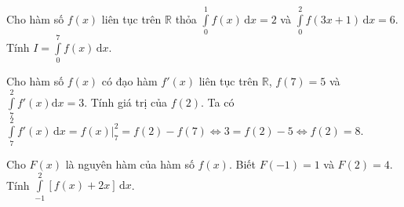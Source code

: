 \begin{bt}%
	Cho hàm số $f(x)$ liên tục trên $\mathbb{R}$ thỏa $\displaystyle\int\limits_{0}^{1} f(x) \mathrm{\,d}x=2$ và $\displaystyle\int\limits_{0}^{2} f(3x+1) \mathrm{\,d}x=6$. Tính $I=\displaystyle\int\limits_{0}^{7} f(x) \mathrm{\,d} x$.
	\end{bt}

\begin{bt}%

Cho hàm số $f(x)$ có đạo hàm $f'(x)$ liên tục trên $\mathbb{R}$, $f(7) = 5$ và $\displaystyle\int\limits_{7}^{2} f'(x)\mathrm{d}x = 3$. Tính giá trị của $f(2)$.
\loigiai
{
Ta có $\displaystyle\int\limits_{7}^{2} f'(x)\mathrm{\,d}x=f(x)\Big|_{7}^{2}=f(2)-f(7) \Leftrightarrow 3=f(2)-5 \Leftrightarrow f(2)=8$.
}
\end{bt}

\begin{bt}%
	Cho $F(x)$ là nguyên hàm của hàm số $f(x)$. Biết $F(-1)=1$ và $F(2)=4$. Tính $\displaystyle\int\limits_{-1}^2\left[ f(x)+2 x\right]  \mathrm{\,d}x$.
\end{bt}

